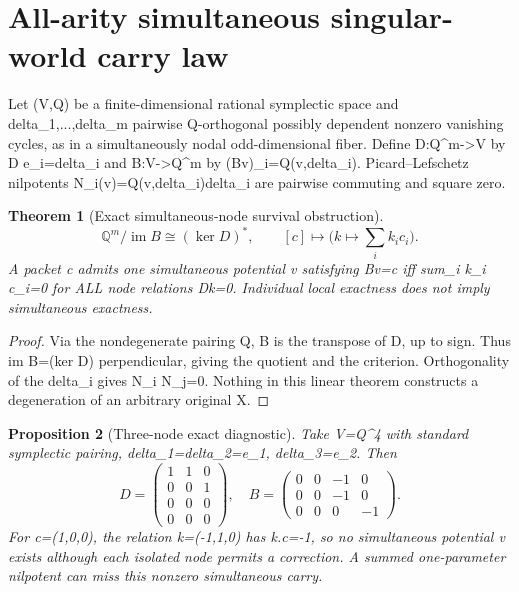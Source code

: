 \documentclass[11pt]{article}
\newtheorem{theorem}{Theorem}[section]
\newtheorem{proposition}[theorem]{Proposition}
\newcommand{\Q}{\mathbb Q}
\newcommand{\im}{\operatorname{im}}
\newcommand{\kerrel}{\operatorname{ker}}
\begin{document}
\section{All-arity simultaneous singular-world carry law}
Let (V,Q) be a finite-dimensional rational symplectic space and delta_1,...,delta_m pairwise Q-orthogonal possibly dependent nonzero vanishing cycles, as in a simultaneously nodal odd-dimensional fiber. Define D:Q^m->V by D e_i=delta_i and B:V->Q^m by (Bv)_i=Q(v,delta_i). Picard--Lefschetz nilpotents N_i(v)=Q(v,delta_i)delta_i are pairwise commuting and square zero.

\begin{theorem}[Exact simultaneous-node survival obstruction]
\[
\boxed{\Q^m/\im B\cong(\kerrel D)^*,\qquad
[c]\mapsto \bigl(k\mapsto\sum_i k_i c_i\bigr).}
\]
A packet c admits one simultaneous potential v satisfying Bv=c iff sum_i k_i c_i=0 for ALL node relations Dk=0. Individual local exactness does not imply simultaneous exactness.
\end{theorem}
\begin{proof}
Via the nondegenerate pairing Q, B is the transpose of D, up to sign. Thus im B=(ker D) perpendicular, giving the quotient and the criterion. Orthogonality of the delta_i gives N_i N_j=0. Nothing in this linear theorem constructs a degeneration of an arbitrary original X.
\end{proof}
\begin{proposition}[Three-node exact diagnostic]
Take V=Q^4 with standard symplectic pairing, delta_1=delta_2=e_1, delta_3=e_2. Then
\[
D=\begin{pmatrix}1&1&0\\0&0&1\\0&0&0\\0&0&0\end{pmatrix},\quad
B=\begin{pmatrix}0&0&-1&0\\0&0&-1&0\\0&0&0&-1\end{pmatrix}.
\]
For c=(1,0,0), the relation k=(-1,1,0) has k.c=-1, so no simultaneous potential v exists although each isolated node permits a correction. A summed one-parameter nilpotent can miss this nonzero simultaneous carry.
\end{proposition}
\end{document}
